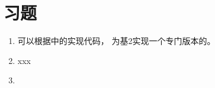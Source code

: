\section{习题}\label{sec:习题07}
\begin{enumerate}
    \item 可以根据中的实现代码，
          为基2实现一个专门版本的。
    \item xxx
    \item \label{sub:7.11.3}\circletwo
\end{enumerate}
